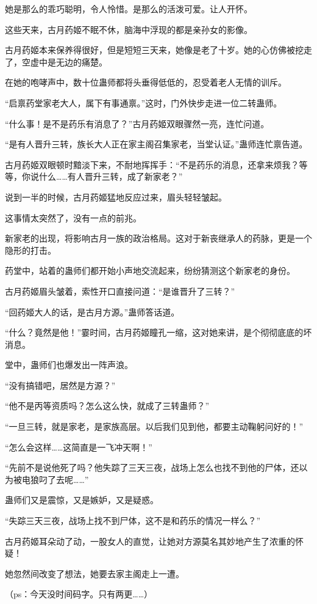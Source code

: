 \begin{this_body}
她是那么的乖巧聪明，令人怜惜。是那么的活泼可爱。让人开怀。

这些天来，古月药姬不眠不休，脑海中浮现的都是亲孙女的影像。

古月药姬本来保养得很好，但是短短三天来，她像是老了十岁。她的心仿佛被挖走了，空虚中是无边的痛楚。

在她的咆哮声中，数十位蛊师都将头垂得低低的，忍受着老人无情的训斥。

“启禀药堂家老大人，属下有事通禀。”这时，门外快步走进一位二转蛊师。

“什么事！是不是药乐有消息了？”古月药姬双眼骤然一亮，连忙问道。

“是有人晋升三转，族长大人正在家主阁召集家老，当堂认证。”蛊师连忙禀告道。

古月药姬双眼顿时黯淡下来，不耐地挥挥手：“不是药乐的消息，还拿来烦我？等等，你说什么……有人晋升三转，成了新家老？”

说到一半的时候，古月药姬猛地反应过来，眉头轻轻皱起。

这事情太突然了，没有一点的前兆。

新家老的出现，将影响古月一族的政治格局。这对于新丧继承人的药脉，更是一个隐形的打击。

药堂中，站着的蛊师们都开始小声地交流起来，纷纷猜测这个新家老的身份。

古月药姬眉头皱着，索性开口直接问道：“是谁晋升了三转？”

“回药姬大人的话，是古月方源。”蛊师答话道。

“什么？竟然是他！”霎时间，古月药姬瞳孔一缩，这对她来讲，是个彻彻底底的坏消息。

堂中，蛊师们也爆发出一阵声浪。

“没有搞错吧，居然是方源？”

“他不是丙等资质吗？怎么这么快，就成了三转蛊师？”

“一旦三转，就是家老，是家族高层。以后我们见到他，都要主动鞠躬问好的！”

“怎么会这样……这简直是一飞冲天啊！”

“先前不是说他死了吗？他失踪了三天三夜，战场上怎么也找不到他的尸体，还以为被电狼叼了去呢……”

蛊师们又是震惊，又是嫉妒，又是疑惑。

“失踪三天三夜，战场上找不到尸体，这不是和药乐的情况一样么？”

古月药姬耳朵动了动，一股女人的直觉，让她对方源莫名其妙地产生了浓重的怀疑！

她忽然间改变了想法，她要去家主阁走上一遭。

（ps：今天没时间码字。只有两更……）

\end{this_body}

